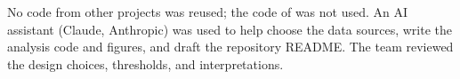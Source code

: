 No code from other projects was reused; the code of \cite{caprioli2025} was not used.
An AI assistant (Claude, Anthropic) was used to help choose the data sources,
write the analysis code and figures, and draft the repository README.
The team reviewed the design choices, thresholds, and interpretations.
